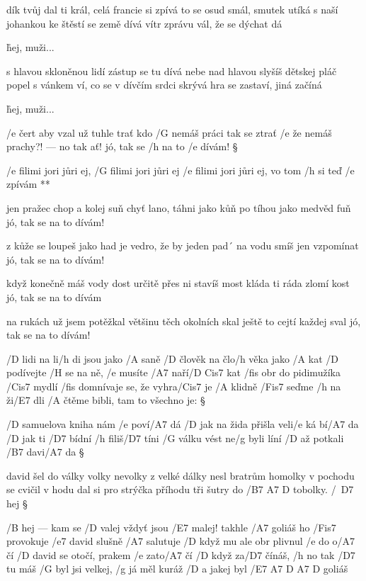 dík tvůj dal ti král, celá francie si zpívá
to se osud smál, smutek utíká
s naší johankou ke štěstí se země dívá
vítr zprávu vál, že se dýchat dá \s

\r hej, muži...

s hlavou skloněnou lidí zástup se tu dívá
nebe nad hlavou slyšíš dětskej pláč
popel s vánkem ví, co se v dívčím srdci skrývá
hra se zastaví, jiná začíná \s

\r hej, muži...




/e čert aby vzal už tuhle trať
kdo /G nemáš práci tak se ztrať
/e že nemáš prachy?! --- no tak ať!
jó, tak se /h na to /e dívám! \S

\R /e filimi jori jůri ej, /G filimi jori jůri ej
   /e filimi jori jůri ej, vo tom /h si teď /e zpívám **

jen pražec chop a kolej suň
chyť lano, táhni jako kůň
po tíhou jako medvěd fuň
jó, tak se na to dívám! \s

z kůže se loupeš jako had
je vedro, že by jeden pad´
na vodu smíš jen vzpomínat
jó, tak se na to dívám! \s

když konečně máš vody dost
určitě přes ni stavíš most
kláda ti ráda zlomí kost
jó, tak se na to dívám \s

na rukách už jsem potěžkal
většinu těch okolních skal
ještě to cejtí každej sval
jó, tak se na to dívám! \s




/D lidi na li/h di jsou jako /A saně
/D člověk na člo/h věka jako /A kat
/D podívejte /H se na ně, /e musíte /A7 naří/{D Cis7} kat
/fis obr do pidimužíka /Cis7 mydlí
/fis domnívaje se, že vyhra/Cis7 je
/A klidně /Fis7 seďme /h na ži/E7 dli
/A čtěme bibli, tam to všechno je: \S

/D samuelova kniha nám /e poví/A7 dá
/D jak na žida přišla veli/e ká bí/A7 da
/D jak ti /D7 bídní /h filiš/D7 tíni %
/G válku vést ne/g byli líní
/D až potkali /B7 davi/A7 da \S

david šel do války volky nevolky
z velké dálky nesl bratrům homolky
v pochodu se cvičil v hodu %
dal si pro strýčka příhodu
tři šutry do /{B7 A7 D} tobolky. /\ D7 hej \S

/B hej --- kam se /D valej vždyť jsou /E7 malej!
takhle /A7 goliáš ho /Fis7 provokuje
/e7 david slušně /A7 salutuje
/D když mu ale obr plivnul /e do o/A7 čí
/D david se otočí, prakem /e zato/A7 čí
/D když za/D7 čínáš, /h no tak /D7 tu máš
/G byl jsi velkej, /g já měl kuráž %
/D a jakej byl /{E7 A7 D A7 D} goliáš



